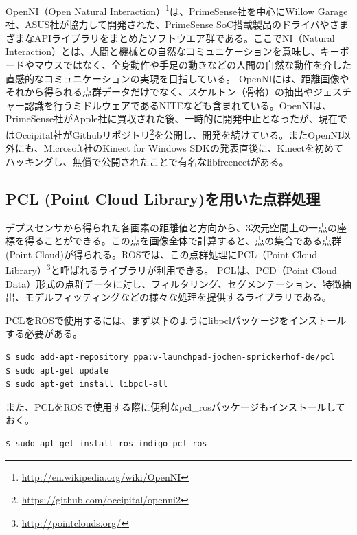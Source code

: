 OpenNI（Open Natural Interaction）\footnote{\url{http://en.wikipedia.org/wiki/OpenNI}}は、PrimeSense社を中心にWillow Garage社、ASUS社が協力して開発された、PrimeSense SoC搭載製品のドライバやさまざまなAPIライブラリをまとめたソフトウエア群である。ここでNI（Natural Interaction）とは、人間と機械との自然なコミュニケーションを意味し、キーボードやマウスではなく、全身動作や手足の動きなどの人間の自然な動作を介した直感的なコミュニケーションの実現を目指している。
OpenNIには、距離画像やそれから得られる点群データだけでなく、スケルトン（骨格）の抽出やジェスチャー認識を行うミドルウェアであるNITEなども含まれている。OpenNIは、PrimeSense社がApple社に買収された後、一時的に開発中止となったが、現在ではOccipital社がGithubリポジトリ\footnote{\url{https://github.com/occipital/openni2}}を公開し、開発を続けている。またOpenNI以外にも、Microsoft社のKinect for Windows SDKの発表直後に、Kinectを初めてハッキングし、無償で公開されたことで有名なlibfreenectがある。

\subsection{PCL (Point Cloud Library)を用いた点群処理}

デプスセンサから得られた各画素の距離値と方向から、3次元空間上の一点の座標を得ることができる。この点を画像全体で計算すると、点の集合である点群(Point Cloud)が得られる。ROSでは、この点群処理にPCL（Point Cloud Library）\footnote{\url{http://pointclouds.org/}}と呼ばれるライブラリが利用できる。
PCLは、PCD（Point Cloud Data）形式の点群データに対し、フィルタリング、セグメンテーション、特徴抽出、モデルフィッティングなどの様々な処理を提供するライブラリである。

PCLをROSで使用するには、まず以下のようにlibpclパッケージをインストールする必要がある。

\begin{lstlisting}[language=ROS]
$ sudo add-apt-repository ppa:v-launchpad-jochen-sprickerhof-de/pcl
$ sudo apt-get update
$ sudo apt-get install libpcl-all
\end{lstlisting}

また、PCLをROSで使用する際に便利なpcl\_rosパッケージもインストールしておく。

\begin{lstlisting}[language=ROS]
$ sudo apt-get install ros-indigo-pcl-ros
\end{lstlisting}

